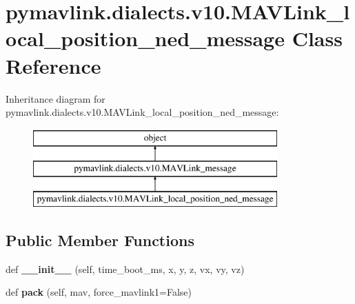 \hypertarget{classpymavlink_1_1dialects_1_1v10_1_1MAVLink__local__position__ned__message}{}\section{pymavlink.\+dialects.\+v10.\+M\+A\+V\+Link\+\_\+local\+\_\+position\+\_\+ned\+\_\+message Class Reference}
\label{classpymavlink_1_1dialects_1_1v10_1_1MAVLink__local__position__ned__message}
Inheritance diagram for pymavlink.\+dialects.\+v10.\+M\+A\+V\+Link\+\_\+local\+\_\+position\+\_\+ned\+\_\+message\+:\begin{figure}[H]
\begin{center}
\leavevmode
\includegraphics[height=3.000000cm]{classpymavlink_1_1dialects_1_1v10_1_1MAVLink__local__position__ned__message}
\end{center}
\end{figure}
\subsection*{Public Member Functions}
\begin{DoxyCompactItemize}
\item 
\mbox{\label{classpymavlink_1_1dialects_1_1v10_1_1MAVLink__local__position__ned__message_a3fcbf4475858353cec8288f7e184bc86}} 
def {\bfseries \+\_\+\+\_\+init\+\_\+\+\_\+} (self, time\+\_\+boot\+\_\+ms, x, y, z, vx, vy, vz)
\item 
\mbox{\label{classpymavlink_1_1dialects_1_1v10_1_1MAVLink__local__position__ned__message_ac44623619ae81584d53ee9e2f4817215}} 
def {\bfseries pack} (self, mav, force\+\_\+mavlink1=False)
\end{DoxyCompactItemize}
